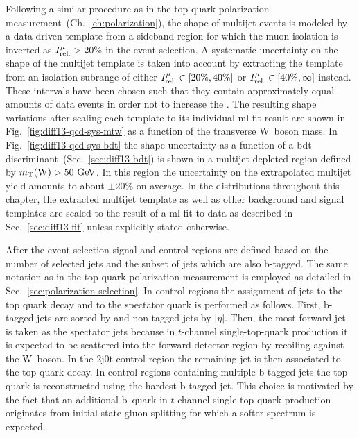 Following a similar procedure as in the top quark polarization measurement~(Ch.~\ref{ch:polarization}), the shape of multijet events is modeled by a data-driven template from a sideband region for which the muon isolation is inverted as $\muiso>20\%$ in the event selection. A systematic uncertainty on the shape of the multijet template is taken into account by extracting the template from an isolation subrange of either $\muiso\in[20\%,40\%]$ or $\muiso\in[40\%,\infty]$ instead. These intervals have been chosen such that they contain approximately equal amounts of data events in order not to increase the . The resulting shape variations after scaling each template to its individual \gls{ml} fit result are shown in Fig.~\ref{fig:diff13-qcd-sys-mtw} as a function of the transverse W~boson mass. In Fig.~\ref{fig:diff13-qcd-sys-bdt} the shape uncertainty as a function of a \gls{bdt} discriminant~(Sec.~\ref{sec:diff13-bdt}) is shown in a multijet-depleted region defined by $m_{\textrm{T}}(\textrm{W})>50~\textrm{GeV}$. In this region the uncertainty on the extrapolated multijet yield amounts to about $\pm20\%$ on average. In the distributions throughout this chapter, the extracted multijet template as well as other background and signal templates are scaled to the result of a \gls{ml} fit to data as described in Sec.~\ref{sec:diff13-fit} unless explicitly stated otherwise.



After the event selection signal and control regions are defined based on the number of selected jets and the subset of jets which are also b-tagged. The same notation as in the top quark polarization measurement is employed as detailed in Sec.~\ref{sec:polarization-selection}. In control regions the assignment of jets to the top quark decay and to the spectator quark is performed as follows. First, b-tagged jets are sorted by \pt and non-tagged jets by $|\eta|$. Then, the most forward jet is taken as the spectator jets because in $t$-channel single-top-quark production it is expected to be scattered into the forward detector region by recoiling against the W~boson. In the 2j0t control region the remaining jet is then associated to the top quark decay. In control regions containing multiple b-tagged jets the top quark is reconstructed using the hardest b-tagged jet. This choice is motivated by the fact that an additional b~quark in $t$-channel single-top-quark production originates from initial state gluon splitting for which a softer spectrum is expected.

